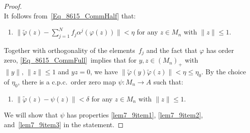 \documentclass[11pt]{amsart}
\theoremstyle{plain}
\theoremstyle{definition}
\theoremstyle{remark}
\numberwithin{equation}{section}
\newcounter{TmpEnumi}
\newcommand{\ph}{\varphi}
\begin{document}
\begin{proof}
\begin{equation}
\end{equation}
%
It follows from~\eqref{Eq_8615_CommHalf}
that:
%
\begin{enumerate}
\setcounter{enumi}{\value{TmpEnumi}}
\item\label{lem7_9item12n}
$\big\| \widetilde{\varphi} (z)
    - \sum_{j = 1}^{N}
         f_{j} \alpha^{j} (\varphi (z)) \big\|
 < \eta$
for any $z \in M_{n}$ with $\| z \| \leq 1$.
\setcounter{TmpEnumi}{\value{enumi}}
\end{enumerate}
%
Together with orthogonality of the elements~$f_j$
and the fact that $\ph$ has order zero,
\eqref{Eq_8615_CommFull}~implies that
for $y, z \in (M_{n})_{+}$ with $\| y \|, \, \| z \| \leq 1$
and $y z = 0$,
we have
$\| \widetilde{\varphi} (y) \widetilde{\varphi} (z) \|
  < \eta \leq \eta_0$.
By the choice of $\eta_0$, there is a c.p.c.~order zero map
$\psi \colon M_{n} \to A$ such that:
%
\begin{enumerate}
\setcounter{enumi}{\value{TmpEnumi}}
\item\label{lem7_9item13n}
$\|\widetilde{ \varphi} (z) - \psi (z) \| < \delta$
for any $z \in M_{n}$ with $\| z \| \leq 1$.
\setcounter{TmpEnumi}{\value{enumi}}
\end{enumerate}
%
We will show that $\psi$ has
properties \ref{lem7_9item1}, \ref{lem7_9item2},
and~\ref{lem7_9item3} in the statement.


\end{proof}
\end{document}
